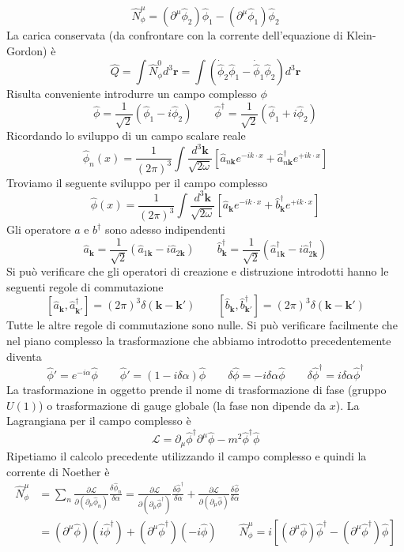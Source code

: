 $$
\hat{N}^\mu_\phi = (\partial^\mu\hat{\phi}_2)\hat{\phi}_1 - (\partial^\mu\hat{\phi}_1)\hat{\phi}_2
$$
La carica conservata (da confrontare con la corrente dell'equazione di Klein-Gordon) è
$$
\hat{Q} = \int \hat{N}^0_\phi d^3\mathbf{r} = \int \left( \dot{\hat{\phi}}_2\hat{\phi}_1 - \dot{\hat{\phi}}_1\hat{\phi}_2 \right) d^3\mathbf{r}
$$
Risulta conveniente introdurre un campo complesso $\phi$
$$
\hat{\phi} = \frac{1}{\sqrt{2}}(\hat{\phi}_1 - i\hat{\phi}_2) \qquad \hat{\phi}^\dagger = \frac{1}{\sqrt{2}}(\hat{\phi}_1 + i\hat{\phi}_2)
$$
Ricordando lo sviluppo di un campo scalare reale
$$
\hat{\phi}_n(x) = \frac{1}{(2\pi)^3} \int \frac{d^3\mathbf{k}}{\sqrt{2\omega}} \left[ \hat{a}_{n\mathbf{k}} e^{-ik\cdot x} + \hat{a}_{n\mathbf{k}}^\dagger e^{+ik\cdot x} \right]
$$
Troviamo il seguente sviluppo per il campo complesso
$$
\hat{\phi}(x) = \frac{1}{(2\pi)^3} \int \frac{d^3\mathbf{k}}{\sqrt{2\omega}} \left[ \hat{a}_{\mathbf{k}} e^{-ik\cdot x} + \hat{b}_{\mathbf{k}}^\dagger e^{+ik\cdot x} \right]
$$
Gli operatore $a$ e $b^\dagger$ sono adesso indipendenti
$$
\hat{a}_{\mathbf{k}} = \frac{1}{\sqrt{2}}(\hat{a}_{1\mathbf{k}} - i\hat{a}_{2\mathbf{k}}) \qquad \hat{b}_{\mathbf{k}}^\dagger = \frac{1}{\sqrt{2}}(\hat{a}_{1\mathbf{k}}^\dagger - i\hat{a}_{2\mathbf{k}}^\dagger)
$$
Si può verificare che gli operatori di creazione e distruzione introdotti hanno le seguenti regole di commutazione
$$
[\hat{a}_{\mathbf{k}}, \hat{a}_{\mathbf{k}'}^\dagger] = (2\pi)^3 \delta(\mathbf{k} - \mathbf{k}') \qquad [\hat{b}_{\mathbf{k}}, \hat{b}_{\mathbf{k}'}^\dagger] = (2\pi)^3 \delta(\mathbf{k} - \mathbf{k}')
$$
Tutte le altre regole di commutazione sono nulle. Si può verificare facilmente che nel piano complesso la trasformazione che abbiamo introdotto precedentemente diventa
$$
\hat{\phi}' = e^{-i\alpha}\hat{\phi} \qquad \hat{\phi}' = (1 - i\delta\alpha)\hat{\phi} \qquad \delta\hat{\phi} = -i\delta\alpha\hat{\phi} \qquad \delta\hat{\phi}^\dagger = i\delta\alpha\hat{\phi}^\dagger
$$
La trasformazione in oggetto prende il nome di trasformazione di fase (gruppo $U(1)$) o trasformazione di gauge globale (la fase non dipende da $x$). La Lagrangiana per il campo complesso è 
$$
\mathcal{L} = \partial_\mu\hat{\phi}^\dagger\partial^\mu\hat{\phi} - m^2\hat{\phi}^\dagger\hat{\phi}
$$
Ripetiamo il calcolo precedente utilizzando il campo complesso e quindi la corrente di Noether è
\begin{align*}
\hat{N}^\mu_\phi &= \sum_n \frac{\partial\mathcal{L}}{\partial(\partial_\mu\hat{\phi}_n)} \frac{\delta\hat{\phi}_n}{\delta\alpha} = \frac{\partial\mathcal{L}}{\partial(\partial_\mu\hat{\phi}^\dagger)} \frac{\delta\hat{\phi}^\dagger}{\delta\alpha} + \frac{\partial\mathcal{L}}{\partial(\partial_\mu\hat{\phi})} \frac{\delta\hat{\phi}}{\delta\alpha} \\
&= (\partial^\mu\hat{\phi})(i\hat{\phi}^\dagger) + (\partial^\mu\hat{\phi}^\dagger)(-i\hat{\phi}) \qquad \hat{N}^\mu_\phi = i \left[ (\partial^\mu\hat{\phi})\hat{\phi}^\dagger - (\partial^\mu\hat{\phi}^\dagger)\hat{\phi} \right]
\end{align*}
